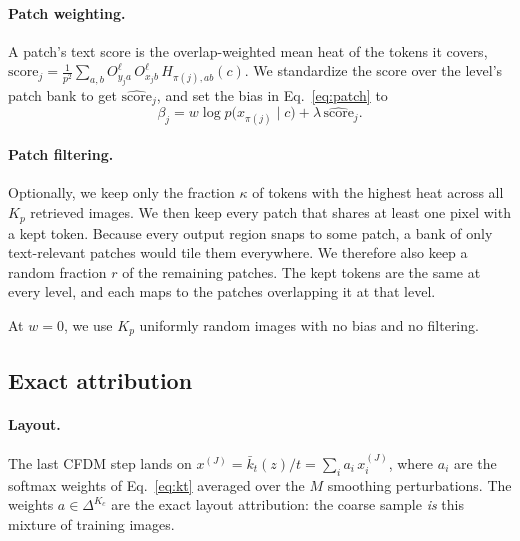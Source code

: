 \paragraph{Patch weighting.}
A patch's text score is the overlap-weighted mean heat of the tokens it covers,
$\mathrm{score}_j = \frac{1}{p^2}\sum_{a,b} O^{\ell}_{y_j a}\,O^{\ell}_{x_j b}\,H_{\pi(j),ab}(c)$.
We standardize the score over the level's patch bank to get $\hat{\mathrm{score}}_j$, and set the bias in Eq.~\eqref{eq:patch} to
\begin{equation}
  \beta_j = w\log p\big(x_{\pi(j)}\mid c\big) + \lambda\,\hat{\mathrm{score}}_j .
\end{equation}

\paragraph{Patch filtering.}
Optionally, we keep only the fraction $\kappa$ of tokens with the highest heat across all $K_p$ retrieved images. We then keep every patch that shares at least one pixel with a kept token. Because every output region snaps to some patch, a bank of only text-relevant patches would tile them everywhere. We therefore also keep a random fraction $r$ of the remaining patches. The kept tokens are the same at every level, and each maps to the patches overlapping it at that level.

At $w=0$, we use $K_p$ uniformly random images with no bias and no filtering.

\subsection{Exact attribution}
\label{sec:attribution}

\paragraph{Layout.}
The last CFDM step lands on $x^{(J)}=\bar k_{t}(z)/t=\sum_i a_i\,x_i^{(J)}$, where $a_i$ are the softmax weights of Eq.~\eqref{eq:kt} averaged over the $M$ smoothing perturbations. The weights $a\in\Delta^{K_c}$ are the exact layout attribution: the coarse sample \emph{is} this mixture of training images.

